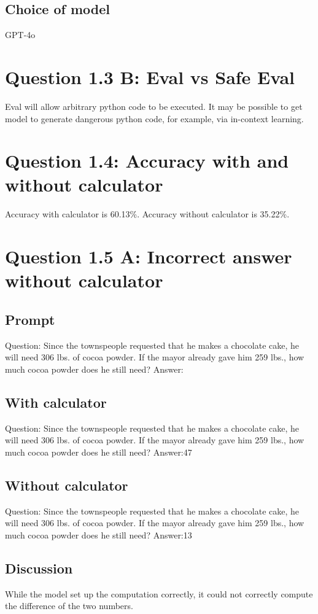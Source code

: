 \documentclass[11pt]{article}
\begin{document}
\subsection{Choice of model}
\label{sec:org9615fe2}
GPT-4o

\section{Question 1.3 B: Eval vs Safe Eval}
\label{sec:org310fa1c}
Eval will allow arbitrary python code to be executed. It may be possible to get model to generate dangerous python code, for example, via in-context learning.
\section{Question 1.4: Accuracy with and without calculator}
\label{sec:orge54e03b}
Accuracy with calculator is 60.13\%. Accuracy without calculator is 35.22\%.

\section{Question 1.5 A: Incorrect answer without calculator}
\label{sec:org1b5d3e1}
\subsection{Prompt}
\label{sec:org34da1ef}
Question: Since the townspeople requested that he makes a chocolate cake, he will need 306 lbs. of cocoa powder.
If the mayor already gave him 259 lbs., how much cocoa powder does he still need?
Answer:
\subsection{With calculator}
\label{sec:org667ec06}
Question: Since the townspeople requested that he makes a chocolate cake, he will need 306 lbs. of cocoa powder.
If the mayor already gave him 259 lbs., how much cocoa powder does he still need?
Answer:\label{org7d9834c}47
\subsection{Without calculator}
\label{sec:org9eaa74f}
Question: Since the townspeople requested that he makes a chocolate cake, he will need 306 lbs. of cocoa powder.
If the mayor already gave him 259 lbs., how much cocoa powder does he still need?
Answer:\label{orgc654815}13
\subsection{Discussion}
\label{sec:org19ee630}
While the model set up the computation correctly, it could not correctly compute the difference of the two numbers.
\end{document}
